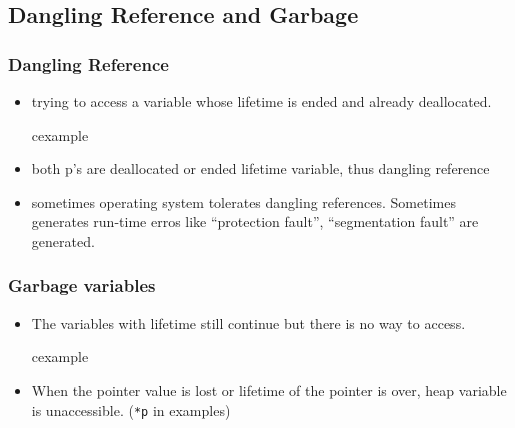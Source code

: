 \subsection{Dangling Reference and Garbage}
\begin{frame}
\frametitle{Dangling Reference}
\begin{itemize}
 \item {\small {} trying to access a variable whose lifetime
 is ended and already deallocated.}
\begin{beamercolorbox}{cexample}
 \codebasibosC
\end{beamercolorbox}
\item {\small both \textsf{p}'s are deallocated or ended lifetime variable, thus dangling
reference}
\item {\small sometimes operating system tolerates dangling references. Sometimes generates
run-time erros like ``protection fault'', ``segmentation fault'' are generated.}
\end{itemize}
 
\end{frame}

\begin{frame}
 \frametitle{Garbage variables}
\begin{itemize}
 \item {} The variables with lifetime still continue but there
 is no way to access.
\begin{beamercolorbox}{cexample}
\codebasibosC
\end{beamercolorbox}
\item When the pointer value is lost or lifetime of the pointer is over, heap variable
is unaccessible. (\texttt{*p} in examples)
\end{itemize}
\end{frame}

